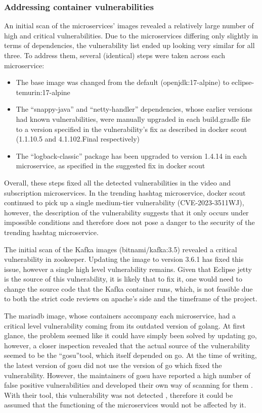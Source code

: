 \documentclass[parskip=full]{article}
\begin{document}
    \subsubsection{Addressing container vulnerabilities}
    An initial scan of the microservices' images revealed a relatively large number of high and critical vulnerabilities.
    Due to the microservices differing only slightly in terms of dependencies, the vulnerability list ended up looking very similar for all three.
    To address them, several (identical) steps were taken across each microservice:
    \begin{itemize}
        \item The base image was changed from the default (openjdk:17-alpine) to eclipse-temurin:17-alpine
        \item The ``snappy-java'' and ``netty-handler'' dependencies, whose earlier versions had known vulnerabilities, were manually upgraded in each build.gradle file to a version specified in the vulnerability's fix as described in docker scout (1.1.10.5 and 4.1.102.Final respectively)
        \item The ``logback-classic'' package has been upgraded to version 1.4.14 in each microservice, as specified in the suggested fix in docker scout
    \end{itemize}
    Overall, these steps fixed all the detected vulnerabilities in the video and subscription microservices.
    In the trending hashtag microservice, docker scout continued to pick up a single medium-tier vulnerability (CVE-2023-3511WJ), however, the description of the vulnerability suggests that it only occurs under impossible conditions \cite{mediumTierImpossibleVulnerability} and therefore does not pose a danger to the security of the trending hashtag microservice.

    The initial scan of the Kafka images (bitnami/kafka:3.5) revealed a critical vulnerability in zookeeper.
    Updating the image to version 3.6.1 has fixed this issue, however a single high level vulnerability remains.
    Given that Eclipse jetty is the source of this vulnerability, it is likely that to fix it, one would need to change the source code that the Kafka container runs, which, is not feasible due to both the strict code reviews on apache's side and the timeframe of the project.

    The mariadb image, whose containers accompany each microservice, had a critical level vulnerability coming from its outdated version of golang.
    At first glance, the problem seemed like it could have simply been solved by updating go, however, a closer inspection revealed that the actual source of the vulnerability seemed to be the ``gosu''tool, which itself depended on go.
    At the time of writing, the latest version of gosu did not use the version of go which fixed the vulnerability.
    However, the maintainers of gosu have reported a high number of false positive vulnerabilities and developed their own way of scanning for them \cite{gosuVulnCheck}.
    With their tool, this vulnerability was not detected \cite{gosuVulnCheckResults}, therefore it could be assumed that the functioning of the microservices would not be affected by it.
\end{document}
